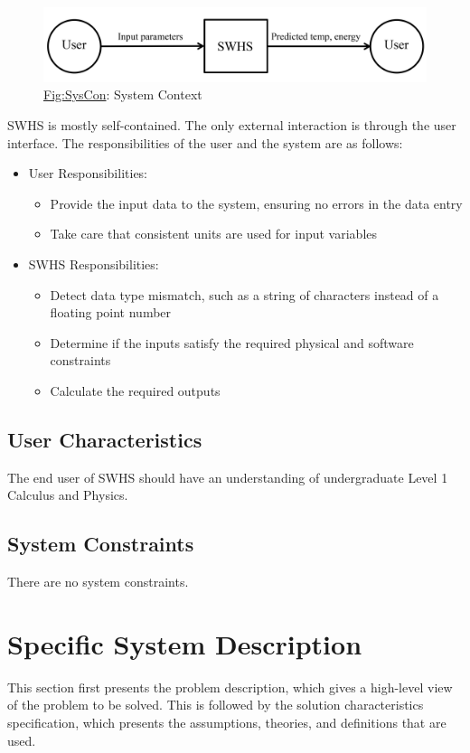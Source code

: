 \documentclass[12pt]{article}
\begin{document}
\begin{figure}
\begin{center}
\includegraphics[width=\textwidth]{../../../datafiles/SWHS/SystemContextFigure.png}
\caption{\hyperref[Figure:SysCon]{Fig:SysCon}: System Context}
\label{Figure:SysCon}
\end{center}
\end{figure}
SWHS is mostly self-contained. The only external interaction is through the user interface. The responsibilities of the user and the system are as follows:

\begin{itemize}
\item{User Responsibilities:}
\begin{itemize}
\item{Provide the input data to the system, ensuring no errors in the data entry}
\item{Take care that consistent units are used for input variables}
\end{itemize}
\item{SWHS Responsibilities:}
\begin{itemize}
\item{Detect data type mismatch, such as a string of characters instead of a floating point number}
\item{Determine if the inputs satisfy the required physical and software constraints}
\item{Calculate the required outputs}
\end{itemize}
\end{itemize}
\subsection{User Characteristics}
\label{Sec:UserChars}
The end user of SWHS should have an understanding of undergraduate Level 1 Calculus and Physics.

\subsection{System Constraints}
\label{Sec:SysConstraints}
There are no system constraints.

\section{Specific System Description}
\label{Sec:SpecSystDesc}
This section first presents the problem description, which gives a high-level view of the problem to be solved. This is followed by the solution characteristics specification, which presents the assumptions, theories, and definitions that are used.
\end{document}

